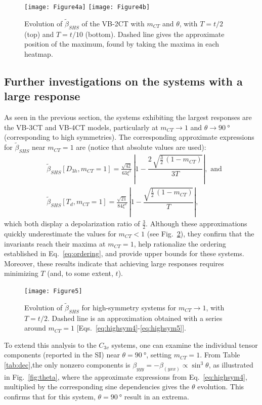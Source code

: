 \documentclass[journal=jpcafh]{achemso}
\begin{document}
\begin{figure}[!h]
	\texttt{[image: Figure4a]}
	\texttt{[image: Figure4b]}
	\caption{Evolution of $\tilde\beta_{SHS}$  of the VB-2CT with $m_{CT}$ and $\theta$, with $T=t/2$ (top) and $T=t/10$ (bottom). Dashed line gives the approximate position of the maximum, found by taking the maxima in each heatmap.}
	\label{fig:3sttheta}
\end{figure}

\clearpage
\subsection{Further investigations on the systems with a large response}

As seen in the previous section, the systems exhibiting the largest responses are the VB-3CT and VB-4CT models, particularly at $m_{CT} \to 1$ and $\theta \to \SI{90}{\degree}$ (corresponding to high symmetries). The corresponding approximate expressions for $\tilde\beta_{SHS}$ near $m_{CT} = 1$ are (notice that absolute values are used):\begin{align}
	&\tilde\beta_{SHS}[D_{3h}, m_{CT}=1] = \frac{\sqrt{42}}{63\xi^2}\,\left|1-\dfrac{2\,\sqrt{\frac{3}{2}\,(1-m_{CT})}}{3T}\right|, \text{ and}\label{eq:highsym4}\\ &\tilde\beta_{SHS}[T_d, m_{CT}=1]  = \frac{\sqrt{21}}{84\xi^2}\,\left|1-\dfrac{\sqrt{\frac{1}{2}\,(1-m_{CT})}}{T}\right|,\label{eq:highsym5}
\end{align}
which both display a depolarization ratio of $\frac{3}{2}$.
Although these approximations quickly underestimate the values for $m_{CT} < 1$ (see Fig.~\ref{fig:series}), they confirm that the invariants reach their maxima at $m_{CT} = 1$, help rationalize the ordering established in Eq.~\eqref{eq:ordering}, and provide upper bounds for these systems. 
Moreover, these results indicate that achieving large responses requires minimizing $T$ (and, to some extent, $t$).

\begin{figure}[!h]
	\texttt{[image: Figure5]}
	\caption{Evolution of $\tilde\beta_{SHS}$ for high-symmetry systems for $m_{CT}\to 1$, with $T=t/2$. Dashed line is an approximation obtained with a series around $m_{CT}=1$ [Eqs.~\eqref{eq:highsym4}-\eqref{eq:highsym5}].}
	\label{fig:series}
\end{figure}

\clearpage

To extend this analysis to the $C_{3v}$ systems, one can examine the individual tensor components (reported in the SI) near $\theta = \SI{90}{\degree}$, setting $m_{CT} = 1$. From Table \ref{tab:dec},the only nonzero components is $\beta_{yyy} = -\beta_{(yxx)} \propto \sin^3\theta$, as illustrated in Fig.~\ref{fig:theta}, where the approximate expressions from Eq.~\eqref{eq:highsym4}, multiplied by the corresponding sine dependencies gives the $\theta$ evolution. This confirms that for this system, $\theta=\SI{90}{\degree}$ result in an extrema.
\end{document}
